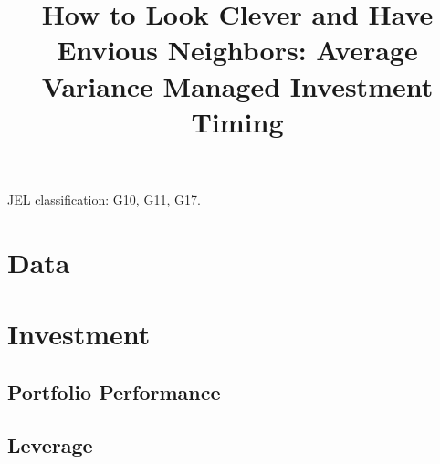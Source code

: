 \documentclass[11pt]{article}
\begin{document}
\onehalfspacing      %


\title{\Large \bf How to Look Clever and Have Envious Neighbors: Average Variance Managed Investment Timing}

\date{}              %


\maketitle
\thispagestyle{empty}

\bigskip



\medskip

\noindent JEL classification: G10, G11, G17.

\clearpage



\section{Data} \label{sec:Data}



\section{Investment} \label{sec:asset_allocation}



\subsection{Portfolio Performance} \label{sec:port_performance}



\subsection{Leverage} \label{sec:leverage}
\end{document}
